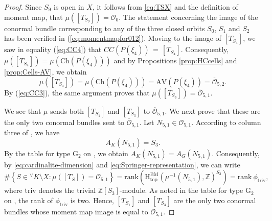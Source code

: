 \documentclass[a4paper, 11pt]{article}
\begin{document}
\begin{proof}
Since $S_9$ is open in $X$, it follows from 
\eqref{eq:TSX} and the definition of moment map,
that $\mu([T_{S_9}])=\mathcal{O}_{0}$. The statement concerning the
image of the conormal bundle corresponding to any of the three closed
orbits $S_0$, $S_1$ and $S_2$ 
has been verified in (\ref{eq:momentmapfor012}). Moving to the image
of $[T_{S_4}]$, we saw in equality (\ref{eq:CC4}) that    
$CC(P(\xi_4))\, =\,  [T_{S_4}]$.
Consequently, $\mu([T_{S_4}])=\mu(\mathrm{Ch}(P(\xi_4)))$ and 
by Propositions \ref{prop:HCcells} and \ref{prop:Cells-AV}, we obtain 
$$\mu([T_{S_4}])= \mu(\mathrm{Ch}(P(\xi_4)))= \mathrm{AV}(P(\xi_4))=
\overline{\mathcal{O}}_{5,2}.$$  
By (\ref{eq:CC3}), the same argument proves that 
$\mu([T_{S_3}])=\overline{\mathcal{O}}_{5,1}$.

We see that $\mu$ sends both $[T_{S_{1}}]$ and $[T_{S_3}]$ to
$\overline{\mathcal{O}}_{5,1}$.  We next prove that these are the only
two conormal bundles sent to $\overline{\mathcal{O}}_{5,1}$.  
Let $N_{5,1}\in \mathcal{O}_{5,1}$. 
According to column three of \cite[Table~1]{Samples}, we have
\[
A_K(N_{5,1}) = S_3.
\]
By the table for type \( \mathrm{G}_{2} \) on  \cite[page 427]{Carter85}, we obtain $A_K(N_{5,1}) =A_{G}(N_{5,1})$.
Consequently, by \eqref{eq:cardinalite-dimension} and \eqref{eq:Springer-representation}, we can write
\[
\#\left\{ S \in {}^\vee K \setminus X : \mu([T_S]) = \mathcal{O}_{5,1} \right\}
= \mathrm{rank}\left( \mathrm{H}_{\mathrm{top}}^{\mathrm{BM}}
(\mu^{-1}(N_{5,1}), \mathbb{Z})^{S_3} \right)
= \mathrm{rank} \ \phi_{\mathrm{triv}},
\]
where $\mathrm{triv}$ denotes the trivial $\mathbb{Z}[S_3]$-module. As noted in 
the table for type \( \mathrm{G}_{2} \) on
\cite[page 427]{Carter85}, the rank of $\phi_{\mathrm{triv}}$ is two. Hence,  
$[T_{S_1}]$ and $[T_{S_3}]$ are the only two conormal bundles whose
moment map image is equal  to $\overline{\mathcal{O}}_{5,1}$.


\end{proof}
\end{document}
